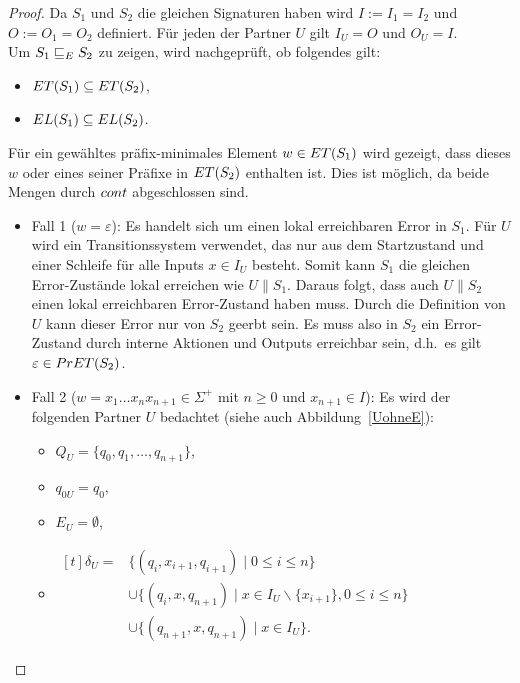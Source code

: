 \begin{proof}
  Da $S_1$ und $S_2$ die gleichen Signaturen haben wird
  $I:=I_1=I_2$ und $O:=O_1=O_2$ definiert. Für jeden der Partner $U$ gilt $I_U=O$ und
  $O_U=I$.\\
  Um $S_1\ERel S_2$ zu zeigen, wird nachgeprüft, ob folgendes gilt:
  \begin{itemize}
    \item $\ET{}(S_1)\subseteq \ET{}(S_2)$,
    \item $\EL{}(S_1)\subseteq \EL{}(S_2)$.
  \end{itemize}
  Für ein gewähltes präfix-minimales Element $w\in \ET{}(S_1)$ wird gezeigt,
  dass dieses $w$ oder eines seiner Präfixe in $\ET{}(S_2)$ enthalten ist.
  Dies ist möglich, da beide Mengen durch $\cont{}$ abgeschlossen sind.
  \begin{itemize}
    \item Fall 1 ($w=\varepsilon$): Es handelt sich um einen lokal erreichbaren
      Error in $S_1$.
      Für $U$ wird ein Transitionssystem verwendet, das nur aus dem Startzustand und
      einer Schleife für alle Inputs $x\in I_U$ besteht. Somit kann $S_1$ die gleichen
      Error-Zustände lokal erreichen wie $U\|S_1$. Daraus folgt, dass auch
      $U\|S_2$ einen lokal erreichbaren Error-Zustand haben muss. Durch die
      Definition von $U$ kann dieser Error nur von $S_2$ geerbt sein. Es
      muss also in $S_2$ ein Error-Zustand durch interne Aktionen und Outputs
      erreichbar sein, d.h.\ es gilt $\varepsilon\in \PrET{}(S_2)$.
    \item Fall 2 ($w=x_1\dots x_n x_{n+1}\in\Sigma ^+$ mit $n\geq 0$ und
      $x_{n+1}\in I$): Es wird der folgenden Partner $U$ bedachtet (siehe auch
      Abbildung~\ref{UohneE}):
      \begin{itemize}
        \item $Q_U=\{q_0,q_1,\dots ,q_{n+1}\}$,
        \item $q_{0U}=q_0$,
        \item $E_U=\emptyset$,
        \item $\begin{aligned}[t]
            \delta _U=&\{(q_i,x_{i+1},q_{i+1})\mid  0\leq i\leq n\}\\
                      &\cup\{(q_i,x,q_{n+1})\mid  x\in I_U\backslash\{x_{i+1}\},
          0\leq i\leq n\}\\
          &\cup\{(q_{n+1},x,q_{n+1})\mid  x\in I_U\}.
        \end{aligned}$
      \end{itemize}
      \begin{figure} [h!tbp]
      \begin{center}
        \begin{tikzpicture}[->, >=latex',auto,node distance =3cm, semithick]


\end{tikzpicture}
\end{center}
\end{figure}
\end{itemize}
\end{proof}
